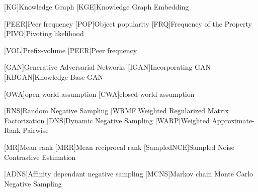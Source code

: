 \begin{acronym}[ECU]

[KG]{Knowledge Graph}
[KGE]{Knowledge Graph Embedding}

[PEER]{Peer frequency}
[POP]{Object popularity }
[FRQ]{Frequency of the Property}
[PIVO]{Pivoting likelihood}

[VOL]{Prefix-volume}
[PEER]{Peer frequency}

[GAN]{Generative Adversarial Networks}
[IGAN]{Incorporating GAN}
[KBGAN]{Knowledge Base GAN}


[OWA]{open-world assumption}
[CWA]{closed-world assumption}

[RNS]{Random Negative Sampling}
[WRMF]{Weighted Regularized Matrix Factorization}
[DNS]{Dynamic Negative Sampling}
[WARP]{Weighted Approximate-Rank Pairwise}

[MR]{Mean rank}
[MRR]{Mean reciprocal rank}
[SampledNCE]{Sampled Noise Contrastive Estimation}

[ADNS]{Affinity dependant negative sampling}
[MCNS]{Markov chain Monte Carlo Negative Sampling}
    
\end{acronym}
